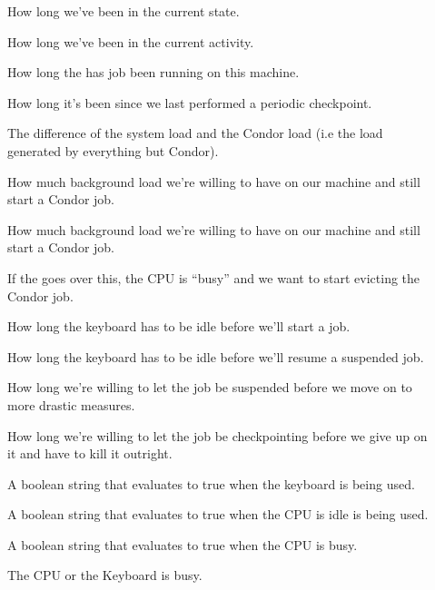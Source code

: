 \begin{description}
  
\item[] How long we've been in the current state.

\item[] How long we've been in the current
  activity. 

\item[] How long the has job been running on
  this machine.

\item[] How long it's been since we last performed a
  periodic checkpoint.

\item[] The difference of the system load and
  the Condor load (i.e the load generated by everything but Condor).

\item[] How much background load we're willing
  to have on our machine and still start a Condor job.

\item[] How much background load we're willing
  to have on our machine and still start a Condor job.

\item[] If the  goes over
  this, the CPU is ``busy'' and we want to start evicting the Condor
  job. 

\item[] How long the keyboard has to be idle
  before we'll start a job.

\item[] How long the keyboard has to be idle
  before we'll resume a suspended job.

\item[] How long we're willing to let the job be
  suspended before we move on to more drastic measures.

\item[] How long we're willing to let the job be
  checkpointing before we give up on it and have to kill it outright.

\item[] A boolean string that evaluates to true
    when the keyboard is being used. 

\item[] A boolean string that evaluates to true
    when the CPU is idle is being used.

\item[] A boolean string that evaluates to true
    when the CPU is busy.

\item[] The CPU or the Keyboard is busy.

\end{description}

